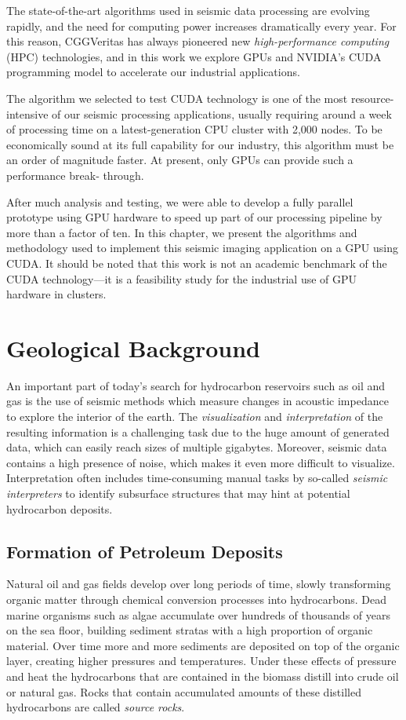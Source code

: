 \documentclass[twocolumn]{article}
\begin{document}
The state-of-the-art algorithms used in seismic data processing are evolving rapidly, and the need for computing power increases dramatically every year. For this reason, CGGVeritas has always pioneered new \emph{high-performance computing} (HPC) technologies, and in this work we explore GPUs and NVIDIA's CUDA programming model to accelerate our industrial applications.

The algorithm we selected to test CUDA technology is one of the most resource-intensive of our seismic processing applications, usually requiring around a week of processing time on a latest-generation CPU cluster with 2,000 nodes. To be economically sound at its full capability for our industry, this algorithm must be an order of magnitude faster. At present, only GPUs can provide such a performance break‐ through.

After much analysis and testing, we were able to develop a fully parallel prototype using GPU hardware to speed up part of our processing pipeline by more than a factor of ten. In this chapter, we present the algorithms and methodology used to implement this seismic imaging application on a GPU using CUDA. It should be noted that this work is not an academic benchmark of the CUDA technology—it is a feasibility study for the industrial use of GPU hardware in clusters.

\section{Geological Background}
An important part of today's search for hydrocarbon reservoirs such as oil and gas is the use of seismic methods which measure changes in acoustic impedance to explore the interior of the earth. The \textit{visualization} and \textit{interpretation} of the resulting information is a challenging task due to the huge amount of generated data, which can easily reach sizes of multiple gigabytes. Moreover, seismic data contains a high presence of noise, which makes it even more difficult to visualize. Interpretation often includes time-consuming manual tasks by so-called \textit{seismic interpreters} to identify subsurface structures that may hint at potential hydrocarbon deposits.

\subsection{Formation of Petroleum Deposits}
Natural oil and gas fields develop over long periods of time, slowly transforming organic matter through chemical conversion processes into hydrocarbons. Dead marine organisms such as algae accumulate over hundreds of thousands of years on the sea floor, building sediment stratas with a high proportion of organic material. Over time more and more sediments are deposited on top of the organic layer, creating higher pressures and temperatures. 
Under these effects of pressure and heat the hydrocarbons that are contained in the biomass distill into crude oil or natural gas. Rocks that contain accumulated amounts of these distilled hydrocarbons are called \textit{source rocks}.
\end{document}
